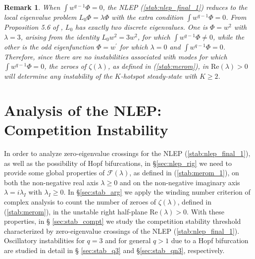 \documentclass{article}%
\newtheorem{rem}[theorem]{Remark}
\begin{document}
\begin{rem}
When $\int w^{q-1}\Phi=0$, the NLEP (\ref{stab:nlep_final_1}) reduces
to the local eigenvalue problem $L_{0}\Phi=\lambda\Phi$ with the extra
condition $\int w^{q-1}\Phi=0$.  From Proposition 5.6 of \cite{dgk_0},
$L_0$ has exactly two discrete eigenvalues. One is $\Phi=w^2$
with $\lambda=3$, arising from the identity $L_0 w^2=3w^2$, for which
$\int w^{q-1}\Phi\neq 0$, while the other is the odd eigenfunction
$\Phi=w^{\prime}$ for which $\lambda=0$ and $\int
w^{q-1}\Phi=0$. Therefore, since there are no instabilities associated
with modes for which $\int w^{q-1}\Phi=0$, the zeroes of
$\zeta(\lambda)$, as defined in (\ref{stab:merom}), in
$\mbox{Re}(\lambda)>0$ will determine any instability of the
$K$-hotspot steady-state with $K\geq 2$.
\end{rem}

\setcounter{equation}{0}
\setcounter{section}{3}
\section{Analysis of the NLEP: Competition Instability}\label{sec:stab_comp}

In order to analyze zero-eigenvalue crossings for the NLEP
(\ref{stab:nlep_final_1}), as well as the possibility of Hopf
bifurcations, in \S \ref{sec:nlep_rig} we need to provide some global
properties of ${\mathcal F}(\lambda)$, as defined in
(\ref{stab:merom_1}), on both the non-negative real axis $\lambda\geq
0$ and on the non-negative imaginary axis $\lambda=i\lambda_I$ with
$\lambda_I\geq 0$.  In \S \ref{sec:stab_arg} we apply the winding
number criterion of complex analysis to count the number of zeroes of
$\zeta(\lambda)$, defined in (\ref{stab:merom}), in the unstable right
half-plane $\mbox{Re}(\lambda)>0$.  With these properties, in \S
\ref{sec:stab_compt} we study the competition stability threshold
characterized by zero-eigenvalue crossings of the NLEP
(\ref{stab:nlep_final_1}). Oscillatory instabilities for $q=3$ and for
general $q>1$ due to a Hopf bifurcation are studied in detail in \S
\ref{sec:stab_q3} and \S \ref{sec:stab_qn3}, respectively.
\end{document}
